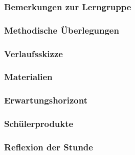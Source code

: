 \subsubsection{Bemerkungen zur Lerngruppe}\label{ssec:project:34:lerngruppe}
\subsubsection{Methodische Überlegungen}
\subsubsection{Verlaufsskizze}
\subsubsection{Materialien}
\subsubsection{Erwartungshorizont}
\subsubsection{Schülerprodukte}
\subsubsection{Reflexion der Stunde}
\newpage

